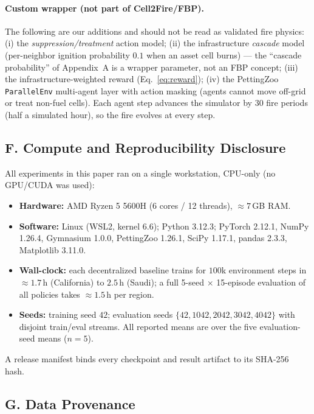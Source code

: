 \documentclass[letterpaper]{article}
\begin{document}
\paragraph{Custom wrapper (not part of Cell2Fire/FBP).} The following are our additions and should not be read as validated fire physics: (i) the \emph{suppression/treatment} action model; (ii) the infrastructure \emph{cascade} model (per-neighbor ignition probability $0.1$ when an asset cell burns) --- the ``cascade probability'' of Appendix~A is a wrapper parameter, not an FBP concept; (iii) the infrastructure-weighted reward (Eq.~\ref{eq:reward}); (iv) the PettingZoo \texttt{ParallelEnv} multi-agent layer with action masking (agents cannot move off-grid or treat non-fuel cells). Each agent step advances the simulator by $30$ fire periods (half a simulated hour), so the fire evolves at every step.

\subsection*{F. Compute and Reproducibility Disclosure}

All experiments in this paper ran on a single workstation, CPU-only (no GPU/CUDA was used):
\begin{itemize}
    \item \textbf{Hardware:} AMD Ryzen 5 5600H (6 cores / 12 threads), $\approx 7$\,GB RAM.
    \item \textbf{Software:} Linux (WSL2, kernel 6.6); Python 3.12.3; PyTorch 2.12.1, NumPy 1.26.4, Gymnasium 1.0.0, PettingZoo 1.26.1, SciPy 1.17.1, pandas 2.3.3, Matplotlib 3.11.0.
    \item \textbf{Wall-clock:} each decentralized baseline trains for $100$k environment steps in $\approx 1.7$\,h (California) to $2.5$\,h (Saudi); a full 5-seed $\times$ 15-episode evaluation of all policies takes $\approx 1.5$\,h per region.
    \item \textbf{Seeds:} training seed $42$; evaluation seeds $\{42, 1042, 2042, 3042, 4042\}$ with disjoint train/eval streams. All reported means are over the five evaluation-seed means ($n=5$).
\end{itemize}
A release manifest binds every checkpoint and result artifact to its SHA-256 hash.

\subsection*{G. Data Provenance}
\end{document}
